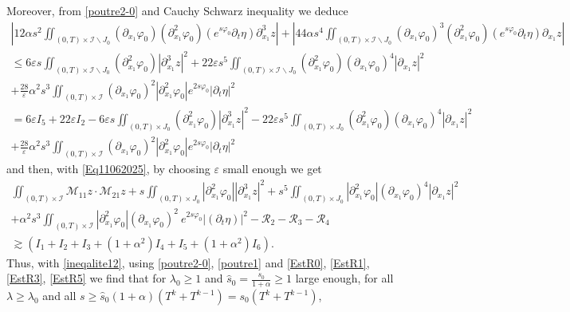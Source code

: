 \documentclass[a4paper, 12pt]{article}
\theoremstyle{plain}
\theoremstyle{definition}
\numberwithin{theorem}{section}
\numberwithin{equation}{section}
\begin{document}
{Moreover, from \eqref{poutre2-0} and Cauchy Schwarz inequality we deduce
\begin{multline*}
\left|12\alpha s^2\iint_{(0,T)\times\mathcal{I}\backslash J_0}(\partial_{x_1}\varphi_0)(\partial^2_{x_1}\varphi_0)(e^{s\varphi_0}\partial_t \eta)\partial^3_{x_1}z\right|+\left|44 \alpha s^4\iint_{(0,T)\times\mathcal{I}\backslash J_0}(\partial_{x_1}\varphi_0)^3(\partial^2_{x_1}\varphi_0)(e^{s\varphi_0}\partial_t \eta)\partial_{x_1}z\right|\\
\leq 6\varepsilon s\iint_{(0,T)\times\mathcal{I}\backslash J_0}(\partial^2_{x_1}\varphi_0)|\partial^3_{x_1}z|^2+22\varepsilon s^5\iint_{(0,T)\times\mathcal{I}\backslash J_0}(\partial^2_{x_1}\varphi_0)(\partial_{x_1}\varphi_0)^4|\partial_{x_1}z|^2\\+\frac{28}{\varepsilon}\alpha^2 s^3\iint_{(0,T)\times\mathcal{I}} (\partial_{x_1}\varphi_0)^2|\partial^2_{x_1}\varphi_0|e^{2s\varphi_0}|\partial_t \eta|^2\\
=6\varepsilon I_5+22\varepsilon I_2-6\varepsilon s\iint_{(0,T)\times J_0}(\partial^2_{x_1}\varphi_0)|\partial^3_{x_1}z|^2-22\varepsilon s^5\iint_{(0,T)\times J_0}(\partial^2_{x_1}\varphi_0)(\partial_{x_1}\varphi_0)^4|\partial_{x_1}z|^2\\
+\frac{28}{\varepsilon}\alpha^2 s^3\iint_{(0,T)\times\mathcal{I}}(\partial_{x_1}\varphi_0)^2|\partial^2_{x_1}\varphi_0| e^{2s\varphi_0}|\partial_t \eta|^2
\end{multline*}
and then, with \eqref{Eq11062025}, by choosing $\varepsilon$ small enough we get
\begin{multline*}
\iint_{(0,T)\times\mathcal{I}}\mathcal{M}_{11} z\cdot \mathcal{M}_{21} z+s\iint_{(0,T)\times J_0}|\partial^2_{x_1}\varphi_0||\partial^3_{x_1}z|^2+ s^5\iint_{(0,T)\times J_0}|\partial^2_{x_1}\varphi_0|(\partial_{x_1}\varphi_0)^4|\partial_{x_1}z|^2\\
+\alpha^2 s^3\iint_{(0,T)\times\mathcal{I}}|\partial^2_{x_1}\varphi_0| (\partial_{x_1}\varphi_0)^2~e^{2s\varphi_0}|(\partial_t \eta)|^2-\mathcal{R}_2-\mathcal{R}_3-\mathcal{R}_4\\
\gtrsim (I_1+ I_2+ I_3+ (1+\alpha^2)I_4+I_5+ (1+\alpha^2)I_6).
\end{multline*}
Thus, with \eqref{ineqalite12}, using \eqref{poutre2-0}, \eqref{poutre1} and \eqref{EstR0}, \eqref{EstR1}, \eqref{EstR3}, \eqref{EstR5} we find that for $\lambda_0\geq 1$ and $\widehat{s}_0=\frac{s_0}{1+\alpha}\geq 1 $ large enough, for all $\lambda\geq\lambda_0$ and all $s\geq \widehat{s}_0(1+\alpha)(T^k+T^{k-1})=s_0(T^k+T^{k-1})$, 

}
\end{document}

